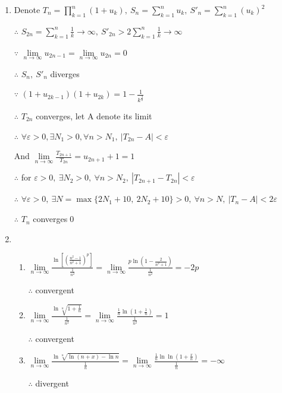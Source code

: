 \begin{enumerate}[1]
        \item
        Denote $T_n=\prod\limits_{k=1}^{n} (1+u_k),\ S_n=\sum\limits_{k=1}^{n} u_k,\  S'_n=\sum\limits_{k=1}^{n} (u_k)^2$
        \par $\therefore$ $S_{2n}=\sum\limits_{k=1}^n\frac{1}{k}\rightarrow \infty,\ S'_{2n}>2\sum\limits_{k=1}^n\frac{1}{k}\rightarrow \infty$
        \par $\because$ $\lim\limits_{n\rightarrow{\infty}}u_{2n-1}=\lim\limits_{n\rightarrow{\infty}}u_{2n}=0$
        \par $\therefore$ $S_n,\ S'_n$ diverges
        \par $\because$ $(1+u_{2k-1})(1+u_{2k})=1-\frac{1}{k^{\frac{3}{2}}}$
        \par $\therefore$ $T_{2n}$ converges, let A denote its limit
        \par $\therefore$ $\forall \varepsilon >0,\exists N_1>0,\forall n>N_1,\  |T_{2n}-A|<\varepsilon$
        \par And $\lim\limits_{n\rightarrow{\infty}}\frac{T_{2n+1}}{T_{2n}}=u_{2n+1}+1=1$
        \par $\therefore$ for $\varepsilon >0,\ \exists N_2>0,\ \forall n>N_2,\ |T_{2n+1}-T_{2n}|<\varepsilon$
        \par $\therefore$ $\forall \varepsilon >0,\ \exists N=\max \{2N_1+10,\ 2N_2+10\}>0,\ \forall n>N,\  |T_{n}-A|<2\varepsilon$
        \par $\therefore$ $T_{n}$ converges\qed

        \item
            \begin{enumerate}[(1)]
                \item
                $\lim\limits_{n\rightarrow{\infty}}\frac{\ln [(\frac{n^2-1}{n^2+1})^p]}{\frac{1}{n^2}}=\lim\limits_{n\rightarrow{\infty}}\frac{p\ln (1-\frac{2}{n^2+1})}{\frac{1}{n^2}}=-2p$
                \par $\therefore$ convergent

                \item
                $\lim\limits_{n\rightarrow{\infty}}\frac{\ln \sqrt[n]{1+\frac{1}{n}}}{\frac{1}{n^2}}=\lim\limits_{n\rightarrow{\infty}}\frac{\frac{1}{n}\ln (1+\frac{1}{n})}{\frac{1}{n^2}}=1$
                \par $\therefore$ convergent

                \item
                $\lim\limits_{n\rightarrow{\infty}}\frac{\ln \sqrt[n]{\ln (n+x)-\ln n}}{\frac{1}{n}}=\lim\limits_{n\rightarrow{\infty}}\frac{\frac{1}{n}\ln \ln (1+\frac{x}{n})}{\frac{1}{n}}=-\infty$
                \par $\therefore$ divergent


\end{enumerate}
\end{enumerate}
